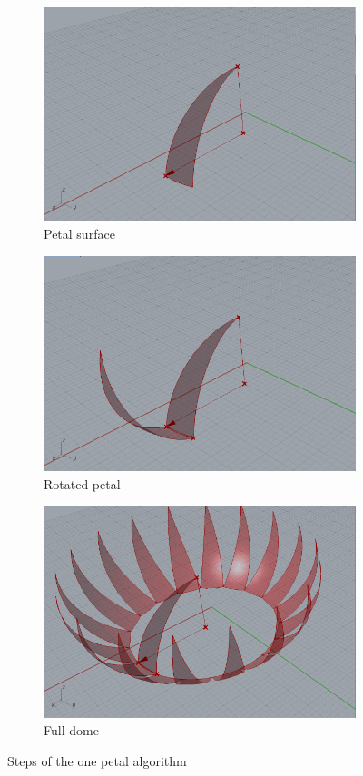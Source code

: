 \documentclass[preprint,12pt,3p]{elsarticle}
\begin{document}
\begin{figure}
\begin{subfigure}{0.3\textwidth}
  \centering
  \includegraphics[width=.9\linewidth]{a01s06.png}
  \caption{Petal surface}
  \label{fig:a01s06}
\end{subfigure}
\begin{subfigure}{0.3\textwidth}
  \centering
  \includegraphics[width=.9\linewidth]{a01s08.png}
  \caption{Rotated petal}
  \label{fig:a01s08}
\end{subfigure}
\begin{subfigure}{0.3\textwidth}
  \centering
  \includegraphics[width=.9\linewidth]{a01s09.png}
  \caption{Full dome}
  \label{fig:a01s09}
\end{subfigure}


\caption{Steps of the one petal algorithm}
\label{fig:a01steps}
\end{figure}
\end{document}
